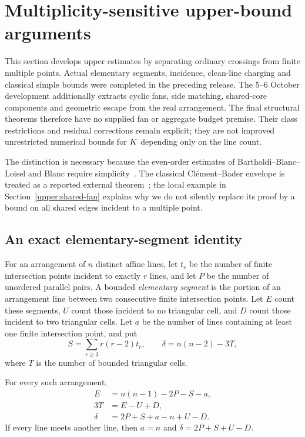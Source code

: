 \section{Multiplicity-sensitive upper-bound arguments}
\label{upper:scope}

This section develops upper estimates by separating ordinary crossings from finite multiple points. Actual elementary segments, incidence, clean-line charging and classical simple bounds were completed in the preceding release. The 5--6 October development additionally extracts cyclic fans, side matching, shared-core components and geometric escape from the real arrangement. The final structural theorems therefore have no supplied fan or aggregate budget premise. Their class restrictions and residual corrections remain explicit; they are not improved unrestricted numerical bounds for $K$ depending only on the line count.

The distinction is necessary because the even-order estimates of Bartholdi--Blanc--Loisel and Blanc require simplicity~\citep{bbl2008,blanc2011}. The classical Cl\'ement--Bader envelope is treated as a reported external theorem~\citep{clementbader2007}; the local example in Section~\ref{upper:shared-fan} explains why we do not silently replace its proof by a bound on all shared edges incident to a multiple point.

\subsection{An exact elementary-segment identity}

\begin{definition}
For an arrangement of $n$ distinct affine lines, let $t_r$ be the number of finite intersection points incident to exactly $r$ lines, and let $P$ be the number of unordered parallel pairs. A bounded \emph{elementary segment} is the portion of an arrangement line between two consecutive finite intersection points. Let $E$ count these segments, $U$ count those incident to no triangular cell, and $D$ count those incident to two triangular cells. Let $a$ be the number of lines containing at least one finite intersection point, and put
\[
 S=\sum_{r\ge3}r(r-2)t_r,\qquad
 \delta=n(n-2)-3T,
\]
where $T$ is the number of bounded triangular cells.
\end{definition}

\begin{proposition}
\label{upper:identity}
For every such arrangement,
\begin{align}
 E&=n(n-1)-2P-S-a,\\
 3T&=E-U+D,\\
 \delta&=2P+S+a-n+U-D.
 \label{upper:defect-general}
\end{align}
If every line meets another line, then $a=n$ and $\delta=2P+S+U-D$.
\end{proposition}

